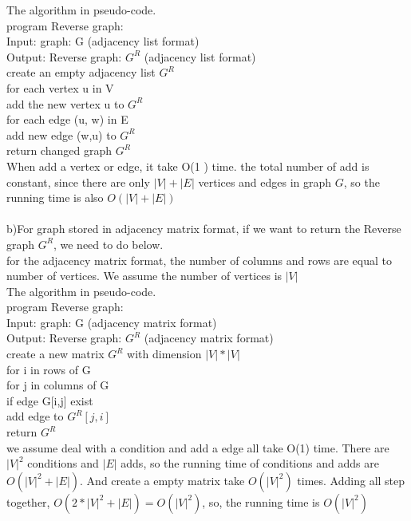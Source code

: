\documentclass[11pt]{article}
\newcommand\tab[1][1cm]{\hspace*{#1}}
\begin{document}
The algorithm in  pseudo-code. \\
program  Reverse graph: \\
Input:  graph: G (adjacency list format) \\
Output: Reverse graph: $G^R$ (adjacency list format)\\
create an empty adjacency list $G^R$ \\
for each vertex u in V \\
\tab add the new vertex u to $G^R$\\
\tab for each edge (u, w) in E \\
\tab \tab add new edge (w,u) to $G^R$ \\
return changed graph $G^R$ \\
When add a vertex or edge, it take O(1 ) time. the total number of add is constant, since there are only $|V|+|E|$ vertices and edges in graph $G$, so the running time is also $O(|V|+|E|)$\\
\\
b)For graph stored in adjacency matrix format, if we want to return the Reverse graph $G^R$, we need to do below.\\
for the adjacency matrix format, the number of columns and rows are equal to number of vertices. We assume the number of vertices is $|V|$\\
The algorithm in  pseudo-code. \\
program  Reverse graph: \\
Input:  graph: G (adjacency matrix format) \\
Output: Reverse graph: $G^R$ (adjacency matrix format)\\
create a new matrix $G^R$ with dimension $|V|*|V|$\\
for i in rows of G\\
\tab for j in columns of G\\
\tab \tab if edge G[i,j] exist\\
\tab \tab \tab add edge to $G^R[j,i]$\\
return $G^R$\\
we assume deal with a condition and add a edge all take O(1) time. There are $|V|^2$ conditions and $|E|$ adds, so the running time of conditions and adds are $O(|V|^2+|E|)$. And create a empty matrix take $O(|V|^2)$ times. Adding all step together, $O(2*|V|^2+|E|)=O(|V|^2)$, so, the running time is $O(|V|^2)$
\end{document}
